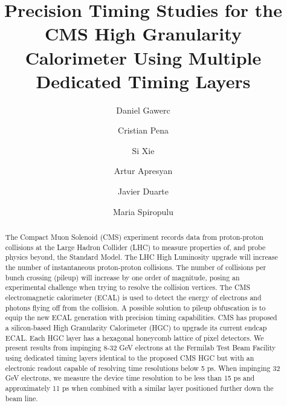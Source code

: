 \documentclass[twocolumn,aps,prd,reprint,superscriptaddress,floatfix]{revtex4-1}
\begin{document}
	\graphicspath{{DanielGawerc/}}
	
	\title{Precision Timing Studies for the CMS High Granularity Calorimeter Using Multiple Dedicated Timing  Layers}
	\author{Daniel Gawerc}
	\author{Cristian Pena}
	\author{Si Xie}
	\author{Artur Apresyan}
	\author{Javier Duarte}
	\author{Maria Spiropulu}


\begin{abstract}
The Compact Muon Solenoid (CMS) experiment records data from proton-proton collisions at the Large Hadron Collider (LHC) to measure properties of, and probe physics beyond, the Standard Model.
The LHC High Luminosity upgrade will increase the number of instantaneous proton-proton collisions.
The number of collisions per bunch crossing (pileup) will increase by one order of magnitude, posing an experimental challenge when trying to resolve the collision vertices.
The CMS electromagnetic calorimeter (ECAL) is used to detect the energy of electrons and photons flying off from the collision.
A possible solution to pileup obfuscation is to equip the new ECAL generation with precision timing capabilities.
CMS has proposed a silicon-based High Granularity Calorimeter (HGC) to upgrade its current endcap ECAL.
Each HGC layer has a hexagonal honeycomb lattice of pixel detectors. 
We present results from impinging 8-32 GeV electrons at the Fermilab Test Beam Facility using dedicated timing layers identical to the proposed CMS HGC but with an electronic readout capable of resolving time resolutions below 5 ps.
When impinging 32 GeV electrons, we measure the device time resolution to be less than 15 ps and approximately 11 ps when combined with a similar layer positioned further down the beam line.
\end{abstract}

\maketitle
\end{document}
